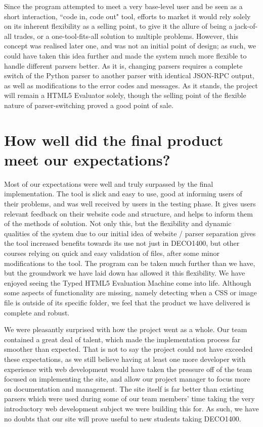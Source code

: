 \documentclass[10pt]{article}
\begin{document}
Since the program attempted to meet a very base-level user and be seen as a short interaction, ``code in, code out" tool, efforts to market it would rely solely on its inherent flexibility as a selling point, to give it the allure of being a jack-of-all trades, or a one-tool-fits-all solution to multiple problems. However, this concept was realised later one, and was not an initial point of design; as such, we could have taken this idea further and made the system much more flexible to handle different parsers better. As it is, changing parsers requires a complete switch of the Python parser to another parser with identical JSON-RPC output, as well as modifications to the error codes and messages. As it stands, the project will remain a HTML5 Evaluator solely, though the selling point of the flexible nature of parser-switching proved a good point of sale.

\section{How well did the final product meet our expectations?}

Most of our expectations were well and truly surpassed by the final implementation. The tool is slick and easy to use, good at informing users of their problems, and was well received by users in the testing phase. It gives users relevant feedback on their website code and structure, and helps to inform them of the methods of solution. Not only this, but the flexibility and dynamic qualities of the system due to our initial idea of website / parser separation gives the tool increased benefits towards its use not just in DECO1400, but other courses relying on quick and easy validation of files, after some minor modifications to the tool. The program can be taken much further than we have, but the groundwork we have laid down has allowed it this flexibility. We have enjoyed seeing the Typed HTML5 Evaluation Machine come into life. Although some aspects of functionality are missing, namely detecting when a CSS or image file is outside of its specific folder, we feel that the product we have delivered is complete and robust.

We were pleasantly surprised with how the project went as a whole. Our team contained a great deal of talent, which made the implementation process far smoother than expected. That is not to say the project could not have exceeded these expectations, as we still believe having at least one more developer with experience with web development would have taken the pressure off of the team focused on implementing the site, and allow our project manager to focus more on documentation and management. The site itself is far better than existing parsers which were used during some of our team members' time taking the very introductory web development subject we were building this for. As such, we have no doubts that our site will prove useful to new students taking DECO1400.
\end{document}
